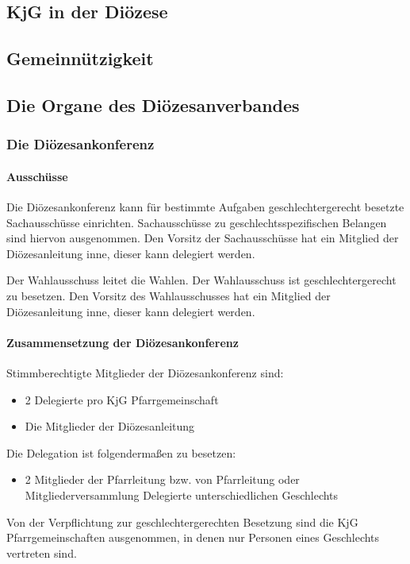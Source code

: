 \documentclass[12pt]{report}
\begin{document}
\begin{flushleft}
\chapter{KjG in der Diözese}

\section{Gemeinnützigkeit}
\section{Die Organe des Diözesanverbandes}
\subsection{Die Diözesankonferenz}
\subsubsection{Ausschüsse}
Die Diözesankonferenz kann für bestimmte Aufgaben {\color{red}geschlechtergerecht} besetzte Sachausschüsse einrichten.
Sachausschüsse zu geschlechtsspezifischen Belangen sind hiervon ausgenommen.
Den Vorsitz der Sachausschüsse hat ein Mitglied der Diözesanleitung inne, dieser kann delegiert
werden.

Der Wahlausschuss leitet die Wahlen. Der Wahlausschuss ist {\color{red}geschlechtergerecht} zu besetzen. Den Vorsitz
des Wahlausschusses hat ein Mitglied der Diözesanleitung inne, dieser kann delegiert werden.

\subsubsection{Zusammensetzung der Diözesankonferenz}
Stimmberechtigte Mitglieder der Diözesankonferenz sind:
\begin{itemize}
  \item 2 Delegierte pro KjG Pfarrgemeinschaft
  \item Die Mitglieder der Diözesanleitung
\end{itemize}

Die Delegation ist folgendermaßen zu besetzen:
\begin{itemize}
  \item{\color{red} 2 Mitglieder der Pfarrleitung bzw. von Pfarrleitung oder Mitgliederversammlung
        Delegierte unterschiedlichen Geschlechts}
\end{itemize}

{\color{red}Von der Verpflichtung zur geschlechtergerechten Besetzung sind die KjG Pfarrgemeinschaften ausgenommen,
in denen nur Personen eines Geschlechts vertreten sind.}


\end{flushleft}
\end{document}
